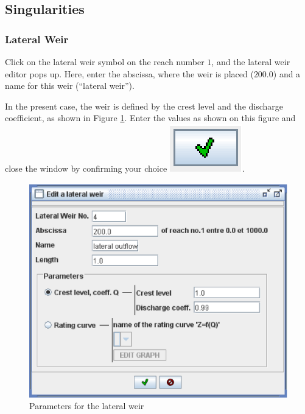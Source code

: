 \documentclass[a4paper,12pt]{article}
\begin{document}
\subsection{Singularities\label{sub:Singularities}}


\subsubsection{Lateral Weir  }

\hspace{0.5cm}Click on the lateral weir symbol on the reach number $1$, and the lateral
weir editor pops up. Here, enter the abscissa, where the weir is placed
($200.0$) and a name for this weir ({}``lateral weir'').

\vspace{0.5cm}

In the present case, the weir is defined by the crest level and the
discharge coefficient, as shown in Figure \ref{fig:param_lateral_weir}.
Enter the values as shown on this figure and close the window by confirming
your choice \includegraphics[scale=0.6]{valid}.

\begin{figure}[h]
  \begin{center}
  \includegraphics[scale=0.6]{lateral_weir}
  \caption{Parameters for the lateral weir}
  \label{fig:param_lateral_weir}
  \end{center}
\end{figure}
\end{document}
